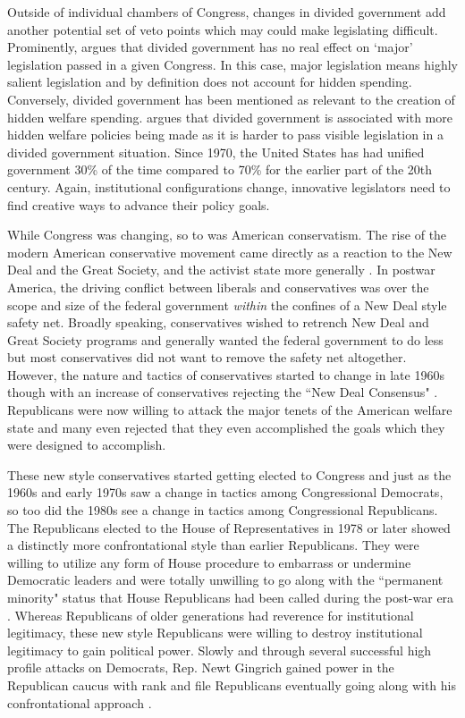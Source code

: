 \documentclass[12pt]{article}
\begin{document}
Outside of individual chambers of Congress, changes in divided government add another potential set of veto points which may could make legislating difficult. Prominently, \cite{mayhew1990} argues that divided government has no real effect on `major' legislation passed in a given Congress. In this case, major legislation means highly salient legislation and by definition does not account for hidden spending. Conversely, divided government has been mentioned as relevant to the creation of hidden welfare spending. \citet[Ch. 4]{howard2008} argues that divided government is associated with more hidden welfare policies being made as it is harder to pass visible legislation in a divided government situation. Since 1970, the United States has had unified government 30\% of the time compared to 70\% for the earlier part of the 20th century. Again, institutional configurations change, innovative legislators need to find creative ways to advance their policy goals.

While Congress was changing, so to was American conservatism. The rise of the modern American conservative movement came directly as a reaction to the New Deal and the Great Society, and the activist state more generally \citep{critchlow2007, zelizer2010}. In postwar America, the driving conflict between liberals and conservatives was over the scope and size of the federal government \emph{within} the confines of a New Deal style safety net. Broadly speaking, conservatives wished to retrench New Deal and Great Society programs and generally wanted the federal government to do less but most conservatives did not want to remove the safety net altogether. However, the nature and tactics of conservatives started to change in late 1960s though with an increase of conservatives rejecting the ``New Deal Consensus" \citep{teles2007, skocpol2007}. Republicans were now willing to attack the major tenets of the American welfare state and many even rejected that they even accomplished the goals which they were designed to accomplish.

These new style conservatives started getting elected to Congress and just as the 1960s and early 1970s saw a change in tactics among Congressional Democrats, so too did the 1980s see a change in tactics among Congressional Republicans. The Republicans elected to the House of Representatives in 1978 or later showed a distinctly more confrontational style than earlier Republicans. They were willing to utilize any form of House procedure to embarrass or undermine Democratic leaders and were totally unwilling to go along with the ``permanent minority" status that House Republicans had been called during the post-war era \citep{theriault2013}. Whereas Republicans of older generations had reverence for institutional legitimacy, these new style Republicans were willing to destroy institutional legitimacy to gain political power. Slowly and through several successful high profile attacks on Democrats, Rep. Newt Gingrich gained power in the Republican caucus with rank and file Republicans eventually going along with his confrontational approach \citep{harris2006}. 
\end{document}
